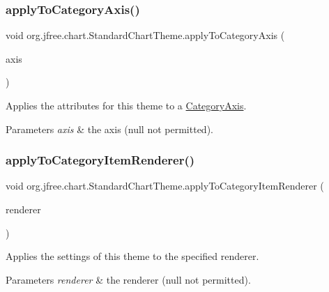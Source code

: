 \subsubsection{\texorpdfstring{apply\+To\+Category\+Axis()}{applyToCategoryAxis()}}
{\footnotesize\ttfamily void org.\+jfree.\+chart.\+Standard\+Chart\+Theme.\+apply\+To\+Category\+Axis (\begin{DoxyParamCaption}\item[{\mbox{\hyperlink{classorg_1_1jfree_1_1chart_1_1axis_1_1_category_axis}{Category\+Axis}}}]{axis }\end{DoxyParamCaption})\hspace{0.3cm}{\ttfamily [protected]}}

Applies the attributes for this theme to a \mbox{\hyperlink{}{Category\+Axis}}.


\begin{DoxyParams}{Parameters}
{\em axis} & the axis ({\ttfamily null} not permitted). \\
\hline
\end{DoxyParams}
\mbox{\label{classorg_1_1jfree_1_1chart_1_1_standard_chart_theme_aa91e56f7c362dd237a215fefd6bf0a69}} 
\subsubsection{\texorpdfstring{apply\+To\+Category\+Item\+Renderer()}{applyToCategoryItemRenderer()}}
{\footnotesize\ttfamily void org.\+jfree.\+chart.\+Standard\+Chart\+Theme.\+apply\+To\+Category\+Item\+Renderer (\begin{DoxyParamCaption}\item[{\mbox{\hyperlink{interfaceorg_1_1jfree_1_1chart_1_1renderer_1_1category_1_1_category_item_renderer}{Category\+Item\+Renderer}}}]{renderer }\end{DoxyParamCaption})\hspace{0.3cm}{\ttfamily [protected]}}

Applies the settings of this theme to the specified renderer.


\begin{DoxyParams}{Parameters}
{\em renderer} & the renderer ({\ttfamily null} not permitted). \\
\hline
\end{DoxyParams}
\mbox{\label{classorg_1_1jfree_1_1chart_1_1_standard_chart_theme_a2d154e98884ec2a197ad15deb73e0a44}} 
